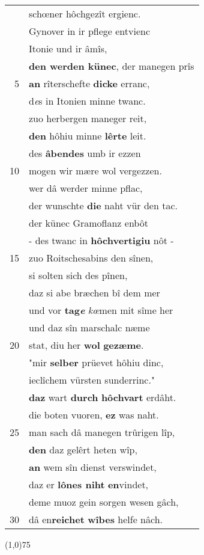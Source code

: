 \documentclass[8pt,a4paper,notitlepage]{article}
\begin{document}
\begin{table}[ht]
\begin{minipage}[t]{0.5\linewidth}
\begin{tabular}{rl}
 & schœner hôchgezît ergienc.\\ 
 & Gynover in ir pflege entvienc\\ 
 & Itonie und ir âmîs,\\ 
 & \textbf{den werden künec}, der manegen prîs\\ 
5 & \textbf{an} rîterschefte \textbf{dicke} erranc,\\ 
 & d\textit{e}s in Itonien minne twanc.\\ 
 & zuo herbergen maneger reit,\\ 
 & \textbf{den} hôhiu minne \textbf{lêrte} leit.\\ 
 & des \textbf{âbendes} umb ir ezzen\\ 
10 & mogen wir mære wol vergezzen.\\ 
 & wer dâ werder minne pflac,\\ 
 & der wunschte \textbf{die} naht vür den tac.\\ 
 & der künec Gramoflanz enbôt\\ 
 & - des twanc in \textbf{hôchvertigiu} nôt -\\ 
15 & zuo Roitschesabins den sînen,\\ 
 & si solten sich des pînen,\\ 
 & daz si abe bræchen bî dem mer\\ 
 & und vor \textbf{tag\textit{e}} \textit{kœ}men mit sîme her\\ 
 & und daz sîn marschalc næme\\ 
20 & stat, diu her \textbf{wol} \textbf{gezæme}.\\ 
 & "mir \textbf{selber} prüevet hôhiu dinc,\\ 
 & ieclîchem vürsten sunderrinc."\\ 
 & \textbf{daz} wart \textbf{durch} \textbf{hôchvart} erdâht.\\ 
 & die boten vuoren, \textbf{ez} was naht.\\ 
25 & man sach dâ manegen trûrigen lîp,\\ 
 & \textbf{den} daz gelêrt heten wîp,\\ 
 & \textbf{an} wem sîn dienst verswindet,\\ 
 & daz er \textbf{lônes niht} \textbf{en}vindet,\\ 
 & deme muoz gein sorgen wesen gâch,\\ 
30 & dâ en\textbf{reichet} \textbf{wîbes} helfe nâch.\\ 
\end{tabular}
\scriptsize
\line(1,0){75} \newline

\end{minipage}
\end{table}
\end{document}
